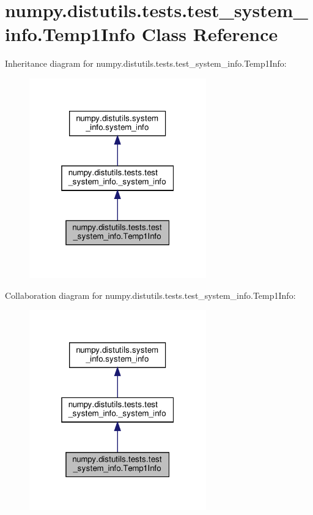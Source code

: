 \hypertarget{classnumpy_1_1distutils_1_1tests_1_1test__system__info_1_1Temp1Info}{}\section{numpy.\+distutils.\+tests.\+test\+\_\+system\+\_\+info.\+Temp1\+Info Class Reference}
\label{classnumpy_1_1distutils_1_1tests_1_1test__system__info_1_1Temp1Info}


Inheritance diagram for numpy.\+distutils.\+tests.\+test\+\_\+system\+\_\+info.\+Temp1\+Info\+:
\nopagebreak
\begin{figure}[H]
\begin{center}
\leavevmode
\includegraphics[width=217pt]{classnumpy_1_1distutils_1_1tests_1_1test__system__info_1_1Temp1Info__inherit__graph}
\end{center}
\end{figure}


Collaboration diagram for numpy.\+distutils.\+tests.\+test\+\_\+system\+\_\+info.\+Temp1\+Info\+:
\nopagebreak
\begin{figure}[H]
\begin{center}
\leavevmode
\includegraphics[width=217pt]{classnumpy_1_1distutils_1_1tests_1_1test__system__info_1_1Temp1Info__coll__graph}
\end{center}
\end{figure}
